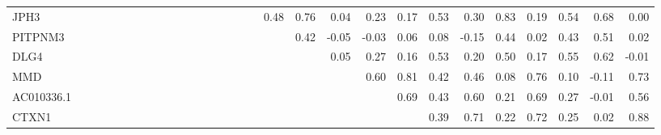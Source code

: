\begin{longtable}{lrrrrrrrrrrrrrrrrrrrrrrrrrrrr}
JPH3       &              &              &              &              &             &              &           &             &            &             &             &               &             &            &              &            &          0.48 &       0.76 &      0.04 &             0.23 &        0.17 &         0.53 &        0.30 &          0.83 &           0.19 &        0.54 &        0.68 &         0.00 \\
PITPNM3    &              &              &              &              &             &              &           &             &            &             &             &               &             &            &              &            &               &       0.42 &     -0.05 &            -0.03 &        0.06 &         0.08 &       -0.15 &          0.44 &           0.02 &        0.43 &        0.51 &         0.02 \\
DLG4       &              &              &              &              &             &              &           &             &            &             &             &               &             &            &              &            &               &            &      0.05 &             0.27 &        0.16 &         0.53 &        0.20 &          0.50 &           0.17 &        0.55 &        0.62 &        -0.01 \\
MMD        &              &              &              &              &             &              &           &             &            &             &             &               &             &            &              &            &               &            &           &             0.60 &        0.81 &         0.42 &        0.46 &          0.08 &           0.76 &        0.10 &       -0.11 &         0.73 \\
AC010336.1 &              &              &              &              &             &              &           &             &            &             &             &               &             &            &              &            &               &            &           &                  &        0.69 &         0.43 &        0.60 &          0.21 &           0.69 &        0.27 &       -0.01 &         0.56 \\
CTXN1      &              &              &              &              &             &              &           &             &            &             &             &               &             &            &              &            &               &            &           &                  &             &         0.39 &        0.71 &          0.22 &           0.72 &        0.25 &        0.02 &         0.88 \\

\end{longtable}
